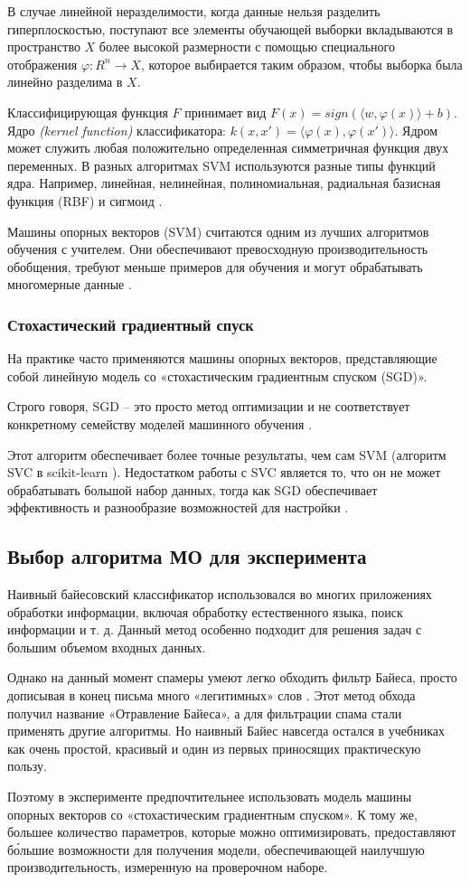 В случае линейной неразделимости, когда данные нельзя разделить гиперплоскостью, поступают
все элементы обучающей выборки вкладываются в пространство $X$ более высокой размерности с
помощью специального отображения $\varphi : R^n \rightarrow X$, которое выбирается таким образом,
чтобы выборка была линейно разделима в $X$.

Классифицирующая функция $F$ принимает вид $F(x)=sign(\langle w, \varphi (x) \rangle + b)$.
Ядро \emph{(kernel function)} классификатора: $k(x, x') = \langle \varphi (x), \varphi (x') \rangle $.
Ядром может служить любая положительно определенная симметричная функция двух переменных.
В разных алгоритмах SVM используются разные типы функций ядра. Например, линейная, нелинейная,
полиномиальная, радиальная базисная функция (RBF) и сигмоид \cite{SVM}.

Машины опорных векторов (SVM) считаются одним из лучших алгоритмов обучения
с учителем. Они обеспечивают превосходную производительность обобщения, требуют
меньше примеров для обучения и могут обрабатывать многомерные данные \cite{scikitSGD}.

\subsubsection{Стохастический градиентный спуск}\label{SGD}
На практике часто применяются машины опорных векторов, представляющие собой
линейную модель со «стохастическим градиентным спуском (SGD)».

Строго говоря, SGD -- это просто метод оптимизации и не соответствует
конкретному семейству моделей машинного обучения \cite{IEEE}.

Этот алгоритм обеспечивает более точные результаты, чем сам SVM (алгоритм SVC в scikit-learn \cite{SVC}).
Недостатком работы с SVC является то, что он не может обрабатывать большой
набор данных, тогда как SGD обеспечивает эффективность и разнообразие
возможностей для настройки \cite{scikitSGD}.

\subsection{Выбор алгоритма МО для эксперимента}
Наивный байесовский классификатор использовался во многих приложениях обработки
информации, включая обработку естественного языка, поиск информации и т. д.
Данный метод особенно подходит для решения задач с большим объемом входных данных.

Однако на данный момент спамеры умеют легко обходить фильтр Байеса, просто дописывая в
конец письма много «легитимных» слов \cite{filters}. Этот метод обхода получил название «Отравление Байеса»,
а для фильтрации спама стали применять другие алгоритмы. Но наивный Байес навсегда остался
в учебниках как очень простой, красивый и один из первых приносящих практическую пользу.

Поэтому в эксперименте предпочтительнее использовать модель машины опорных векторов
со «стохастическим градиентным спуском». К тому же, большее количество параметров,
которые можно оптимизировать, предоставляют бо́льшие возможности для получения модели,
обеспечивающей наилучшую производительность, измеренную на проверочном наборе.

